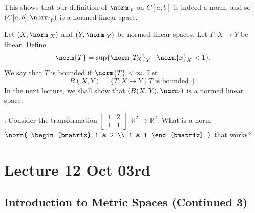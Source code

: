 \documentclass[notoc,notitlepage]{tufte-book}
\begin{document}
This shows that our definition of $\norm\cdot_p$ on $C[a, b]$ is indeed a norm, and so $( C[a, b], \norm\cdot_p )$ is a normed linear space.

\begin{eg}
  Let $(X, \norm\cdot_X)$ and $(Y, \norm\cdot_Y)$ be normed linear spaces. Let $T : X \to Y$ be linear. Define
  \begin{equation*}
    \norm{T} = \sup \{ \norm{T_X}_Y \mid \norm{x}_X < 1 \}.
  \end{equation*}
  We say that $T$ is bounded if $\norm{T} < \infty$. Let
  \begin{equation*}
    B(X, Y) = \{ T : X \to Y \mid T \text{ is bounded } \}.
  \end{equation*}
  In the next lecture, we shall show that $(B(X, Y), \norm\cdot)$ is a normed linear space.
\end{eg}

: Consider the transformation $\begin{bmatrix} 1 & 2 \\ 1 & 1 \end{bmatrix} : \mathbb{R}^2 \to \mathbb{R}^2$. What is a norm $\norm{ \begin{bmatrix} 1 & 2 \\ 1 & 1 \end{bmatrix} }$ that works?



\chapter{Lecture 12 Oct 03rd}%
\label{chp:lecture_12_oct_03rd}

\section{Introduction to Metric Spaces (Continued 3)}%
\label{sec:introduction_to_metric_spaces_continued_3}
\end{document}
